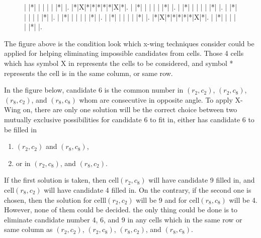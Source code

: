 \documentclass[11pt]{report}
\begin{document}
\begin{figure}
\begin{sudoku}
| |*| | | | | |*| |.
|*|X|*|*|*|*|*|X|*|.
| |*| | | | | |*| |.
| |*| | | | | |*| |.
| |*| | | | | |*| |.
| |*| | | | | |*| |.
| |*| | | | | |*| |.
|*|X|*|*|*|*|*|X|*|.
| |*| | | | | |*| |.
\end{sudoku}
\label{xwingmodel}
\end{figure}

The figure above is the condition look which x-wing techniques consider could be applied for helping eliminating impossible candidates from cells. Those 4 cells which has symbol X in represents the cells to be considered, and symbol * represents the cell is in the same column, or same row. 

In the figure below, candidate 6 is the common number in $(r_{2}, c_{2})$, $(r_{2}, c_{8})$, $(r_{8}, c_{2})$, and $(r_{8}, c_{8})$ whom are consecutive in opposite angle. To apply X-Wing on, there are only one solution will be the correct choice between two mutually exclusive possibilities for candidate 6 to fit in, either has candidate 6 to be filled in 
\begin{enumerate}
\item $(r_{2}, c_{2})$ and $(r_{8}, c_{8})$,
\item or in $(r_{2}, c_{8})$, and $(r_{8}, c_{2})$.
\end{enumerate}
If the first solution is taken, then cell$(r_{2}, c_{8})$ will have candidate 9 filled in, and cell$(r_{8}, c_{2})$ will have candidate 4 filled in. On the contrary, if the second one is chosen, then the solution for celll$(r_{2}, c_{2})$ will be 9 and for cell$(r_{8}, c_{8})$ will be 4. However, none of them could be decided. the only thing could be done is to eliminate candidate number 4, 6, and 9 in any cells which in the same row or same column as $(r_{2}, c_{2})$, $(r_{2}, c_{8})$, $(r_{8}, c_{2})$, and $(r_{8}, c_{8})$.
\end{document}
